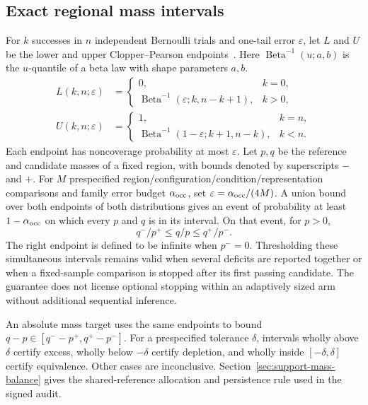 \subsection{Exact regional mass intervals}
For $k$ successes in $n$ independent Bernoulli trials and one-tail error
$\varepsilon$, let $L$ and $U$ be the lower and upper
Clopper--Pearson endpoints~\cite{clopper1934confidence}.
Here $\operatorname{Beta}^{-1}(u;a,b)$ is the $u$-quantile of a beta
law with shape parameters $a,b$.
\begin{align}
L(k,n;\varepsilon)&=\begin{cases}0,&k=0,\\
\operatorname{Beta}^{-1}(\varepsilon;k,n-k+1),&k>0,
\end{cases}\label{eq:cp_lower}\\
U(k,n;\varepsilon)&=\begin{cases}1,&k=n,\\
\operatorname{Beta}^{-1}(1-\varepsilon;k+1,n-k),&k<n.
\end{cases}\label{eq:cp_upper}
\end{align}
Each endpoint has noncoverage probability at most $\varepsilon$.
Let $p,q$ be the reference and candidate masses of a fixed region,
with bounds denoted by superscripts $-$ and $+$.
For $M$ prespecified region/configuration/condition/representation comparisons
and family error budget $\alpha_{\rm occ}$, set $\varepsilon=\alpha_{\rm occ}/(4M)$.
A union bound over both endpoints of both
distributions gives an event of probability at least $1-\alpha_{\rm occ}$ on
which every $p$ and $q$ is in its interval. On that event, for $p>0$,
\begin{equation}
q^-/p^+\leq q/p\leq q^+/p^-.
\label{eq:supp_occupancy}
\end{equation}
The right endpoint is defined to be infinite when $p^-=0$.
Thresholding these simultaneous intervals remains valid when several deficits
are reported together or when a fixed-sample comparison is stopped after its
first passing candidate. The guarantee does not license optional stopping
within an adaptively sized arm without additional sequential inference.

An absolute mass target uses the same endpoints to bound
$q-p\in[q^- -p^+,q^+-p^-]$. For a prespecified tolerance $\delta$,
intervals wholly above $\delta$ certify excess, wholly below $-\delta$
certify depletion, and wholly inside $[-\delta,\delta]$ certify equivalence.
Other cases are inconclusive. Section~\ref{sec:support-mass-balance} gives
the shared-reference allocation and persistence rule used in the signed audit.


